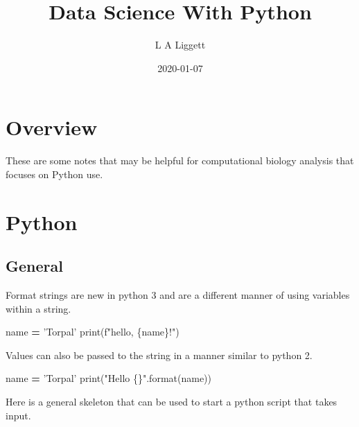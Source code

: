 \documentclass[]{book}
\title{Data Science With Python}
\author{L A Liggett}
\date{2020-01-07}
\newenvironment{Shaded}{\begin{snugshade}}{\end{snugshade}}
\newcommand{\BuiltInTok}[1]{#1}
\newcommand{\NormalTok}[1]{#1}
\newcommand{\OperatorTok}[1]{\textcolor[rgb]{0.81,0.36,0.00}{\textbf{#1}}}
\newcommand{\SpecialCharTok}[1]{\textcolor[rgb]{0.00,0.00,0.00}{#1}}
\newcommand{\SpecialStringTok}[1]{\textcolor[rgb]{0.31,0.60,0.02}{#1}}
\newcommand{\StringTok}[1]{\textcolor[rgb]{0.31,0.60,0.02}{#1}}
\begin{document}
\maketitle

{
\setcounter{tocdepth}{1}
\tableofcontents
}
\hypertarget{overview}{%
\chapter{Overview}\label{overview}}

These are some notes that may be helpful for computational biology analysis that focuses on Python use.

\hypertarget{python}{%
\chapter{Python}\label{python}}

\hypertarget{general}{%
\section{General}\label{general}}

Format strings are new in python 3 and are a different manner of using variables within a string.

\begin{Shaded}
\begin{Highlighting}[]
\NormalTok{name }\OperatorTok{=} \StringTok{'Torpal'}
\BuiltInTok{print}\NormalTok{(}\SpecialStringTok{f"hello, }\SpecialCharTok{\{}\NormalTok{name}\SpecialCharTok{\}}\SpecialStringTok{!"}\NormalTok{)}
\end{Highlighting}
\end{Shaded}

Values can also be passed to the string in a manner similar to python 2.

\begin{Shaded}
\begin{Highlighting}[]
\NormalTok{name }\OperatorTok{=} \StringTok{'Torpal'}
\BuiltInTok{print}\NormalTok{(}\StringTok{"Hello }\SpecialCharTok{\{\}}\StringTok{"}\NormalTok{.}\BuiltInTok{format}\NormalTok{(name))}
\end{Highlighting}
\end{Shaded}

Here is a general skeleton that can be used to start a python script that takes input.
\end{document}
